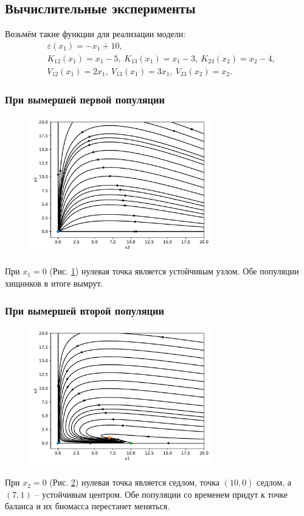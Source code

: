 \subsection{Вычислительные эксперименты}
    Возьмём такие функции для реализации модели:
    \[
        \begin{split}
            & \varepsilon (x_1) = -x_1 + 10, \\
            & K_{12} (x_1) = x_1 - 5, ~ K_{13} (x_1) = x_1 - 3, ~ K_{23} (x_2) = x_2 - 4, \\
            & V_{12} (x_1) = 2 x_1, ~ V_{13} (x_1) = 3 x_1, ~ V_{23} (x_2) = x_2.
        \end{split}
    \]

    \subsubsection{При вымершей первой популяции}

    \begin{figure}[H]
        \centering
        \includegraphics[width=8cm]{pictures/kx1_0vector.pdf}
        \caption{} \label{kx1_0}
    \end{figure}

    При \(x_1 = 0\) (Рис. \ref{kx1_0}) нулевая точка является устойчивым узлом. Обе популяции хищников в итоге вымрут.

    \subsubsection{При вымершей второй популяции}

    \begin{figure}[H]
        \centering
        \includegraphics[width=8cm]{pictures/kx2_0vector.pdf}
        \caption{} \label{kx2_0}
    \end{figure}
    При \(x_2 = 0\) (Рис. \ref{kx2_0}) нулевая точка является седлом, точка \((10, 0)\) седлом, а \( \left( 7, 1 \right) \) -- устойчивым центром. Обе популяции со временем придут к точке баланса и их биомасса перестанет меняться.

